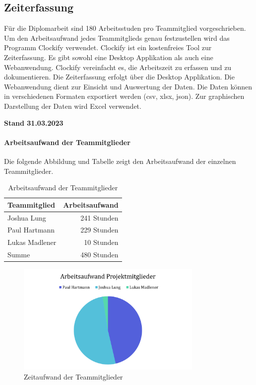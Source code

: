 \subsection{Zeiterfassung}
Für die Diplomarbeit sind 180 Arbeitsstuden pro Teammitglied vorgeschrieben. Um den Arbeitsaufwand jedes Teammitglieds genau festzustellen wird das Programm Clockify verwendet. Clockify ist ein kostenfreies Tool zur Zeiterfassung. Es gibt sowohl eine Desktop Applikation als auch eine Webanwendung. Clockify vereinfacht es, die Arbeitszeit zu erfassen und zu dokumentieren. Die Zeiterfassung erfolgt über die Desktop Applikation. Die Webanwendung dient zur Einsicht und Auswertung der Daten. Die Daten können in verschiedenen Formaten exportiert werden (csv, xlsx, json). Zur graphischen Darstellung der Daten wird Excel verwendet.

\textbf{Stand 31.03.2023}

\paragraph{Arbeitsaufwand der Teammitglieder}
Die folgende Abbildung und Tabelle zeigt den Arbeitsaufwand der einzelnen Teammitglieder.

\begin{table}[H]
  \centering
  \begin{tabular}{lr}
    \toprule
    \textbf{Teammitglied} & \textbf{Arbeitsaufwand} \\
    \midrule
    Joshua Lung           & 241 Stunden             \\
    Paul Hartmann         & 229 Stunden             \\
    Lukas Madlener        & 10 Stunden              \\
    \midrule
    Summe                 & 480 Stunden             \\
    \bottomrule
  \end{tabular}
  \caption{Arbeitsaufwand der Teammitglieder}
  \label{tab:zeiterfassung_teammitglieder}
\end{table}

\begin{figure}[H]
  \centering
  \includegraphics[width=0.8\textwidth]{images/zeiterfassung_teammitglieder.png}
  \caption{Zeitaufwand der Teammitglieder}
  \label{fig:zeiterfassung_teammitglieder}
\end{figure}


